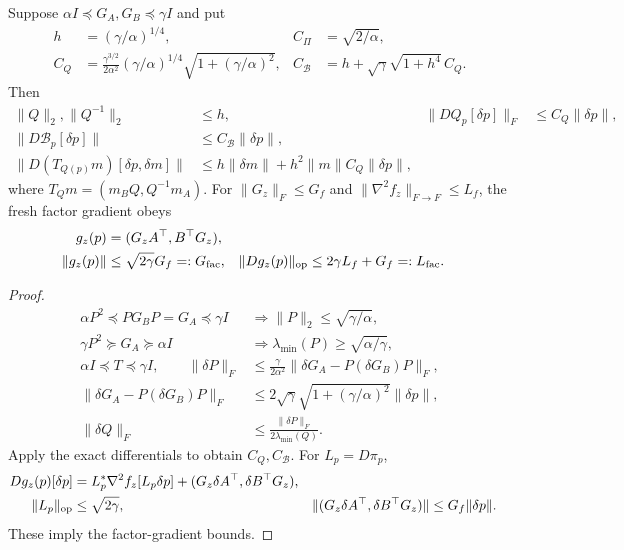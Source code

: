 \begin{proposition}
Suppose
$\alpha I\preceq G_A,G_B\preceq\gamma I$ and put
\begin{align}
h&=(\gamma/\alpha)^{1/4},&
C_\Pi&=\sqrt{2/\alpha},\\
C_Q&=\frac{\gamma^{3/2}}{2\alpha^2}
(\gamma/\alpha)^{1/4}\sqrt{1+(\gamma/\alpha)^2},&
C_{\mathcal B}&=h+\sqrt\gamma\sqrt{1+h^4}\,C_Q .
\end{align}
Then
\begin{align}
\|Q\|_2,\|Q^{-1}\|_2&\leq h,&
\|DQ_p[\delta p]\|_F&\leq C_Q\|\delta p\|,\\
\|D\mathcal B_p[\delta p]\|&\leq C_{\mathcal B}\|\delta p\|,\\
\|D(T_{Q(p)}m)[\delta p,\delta m]\|
&\leq h\|\delta m\|+h^2\|m\|C_Q\|\delta p\|,
\end{align}
where $T_Qm=(m_BQ,Q^{-1}m_A)$.
For $\|G_z\|_F\leq G_f$ and
$\|\nabla^2 f_z\|_{F\to F}\leq L_f$, the fresh factor gradient obeys
\begin{align}
g_z(p)&=(G_zA^\top,B^\top G_z),\\
\|g_z(p)\|&\leq\sqrt{2\gamma}G_f=:G_{\rm fac},&
\|Dg_z(p)\|_{\rm op}&\leq2\gamma L_f+G_f=:L_{\rm fac}.
\label{eq:rigid-state-constants}
\end{align}
\end{proposition}
\begin{proof}
\begin{align}
\alpha P^2\preceq PG_BP=G_A\preceq\gamma I
&\Longrightarrow\|P\|_2\leq\sqrt{\gamma/\alpha},\\
\gamma P^2\succeq G_A\succeq\alpha I
&\Longrightarrow\lambda_{\min}(P)\geq\sqrt{\alpha/\gamma},\\
\alpha I\preceq T\preceq\gamma I,\qquad
\|\delta P\|_F
&\leq\frac{\gamma}{2\alpha^2}
\|\delta G_A-P(\delta G_B)P\|_F,\\
\|\delta G_A-P(\delta G_B)P\|_F
&\leq2\sqrt\gamma\sqrt{1+(\gamma/\alpha)^2}\|\delta p\|,\\
\|\delta Q\|_F&\leq
\frac{\|\delta P\|_F}{2\lambda_{\min}(Q)} .
\end{align}
Apply the exact differentials to obtain $C_Q,C_{\mathcal B}$.
For $L_p=D\pi_p$,
\begin{align}
Dg_z(p)[\delta p]
&=L_p^*\nabla^2f_z[L_p\delta p]
+(G_z\delta A^\top,\delta B^\top G_z),\\
\|L_p\|_{\rm op}&\leq\sqrt{2\gamma},&
\|(G_z\delta A^\top,\delta B^\top G_z)\|
&\leq G_f\|\delta p\|.
\end{align}
These imply the factor-gradient bounds.
\end{proof}

